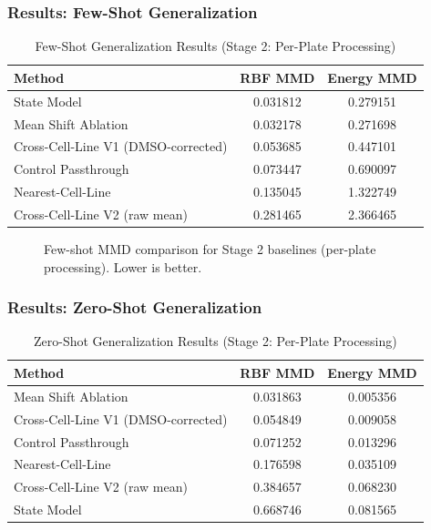 \documentclass[conference]{IEEEtran}
\begin{document}
\subsubsection{Results: Few-Shot Generalization}

\begin{table}[h]
\centering
\caption{Few-Shot Generalization Results (Stage 2: Per-Plate Processing)}
\label{tab:fewshot-stage2}
\begin{tabular}{lcc}
\toprule
\textbf{Method} & \textbf{RBF MMD} & \textbf{Energy MMD} \\
\midrule
State Model & 0.031812 & 0.279151 \\
Mean Shift Ablation & 0.032178 & 0.271698 \\
Cross-Cell-Line V1 (DMSO-corrected) & 0.053685 & 0.447101 \\
Control Passthrough & 0.073447 & 0.690097 \\
Nearest-Cell-Line & 0.135045 & 1.322749 \\
Cross-Cell-Line V2 (raw mean) & 0.281465 & 2.366465 \\
\bottomrule
\end{tabular}
\end{table}

\begin{figure}[h]
\centering
\caption{Few-shot MMD comparison for Stage 2 baselines (per-plate processing). Lower is better.}
\label{fig:fewshot-stage2}
\end{figure}

\subsubsection{Results: Zero-Shot Generalization}

\begin{table}[h]
\centering
\caption{Zero-Shot Generalization Results (Stage 2: Per-Plate Processing)}
\label{tab:zeroshot-stage2}
\begin{tabular}{lcc}
\toprule
\textbf{Method} & \textbf{RBF MMD} & \textbf{Energy MMD} \\
\midrule
Mean Shift Ablation & 0.031863 & 0.005356 \\
Cross-Cell-Line V1 (DMSO-corrected) & 0.054849 & 0.009058 \\
Control Passthrough & 0.071252 & 0.013296 \\
Nearest-Cell-Line & 0.176598 & 0.035109 \\
Cross-Cell-Line V2 (raw mean) & 0.384657 & 0.068230 \\
State Model & 0.668746 & 0.081565 \\
\bottomrule
\end{tabular}
\end{table}
\end{document}
